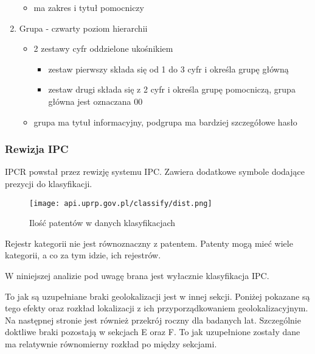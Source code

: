 \begin{enumerate}
\begin{itemize}
        \item ma zakres i tytuł pomocniczy
    \end{itemize}
    \item Grupa - czwarty poziom hierarchii
    \begin{itemize}
        \item 2 zestawy cyfr oddzielone ukośnikiem
        \begin{itemize}
            \item zestaw pierwszy składa się od 1 do 3 cyfr i określa grupę główną
            \item zestaw drugi składa się z 2 cyfr i określa grupę pomocniczą, grupa główna jest oznaczana 00
        \end{itemize}
        \item grupa ma tytuł informacyjny, podgrupa ma bardziej szczegółowe hasło
    \end{itemize}
\end{enumerate}



\subsubsection{Rewizja \ac{IPC}}

\ac{IPCR} powstał przez rewizję systemu \ac{IPC}. Zawiera dodatkowe
symbole dodające prezycji do klasyfikacji.

\begin{figure}[H]\centering
\texttt{[image: api.uprp.gov.pl/classify/dist.png]}
\caption{Ilość patentów w danych klasyfikacjach}
\end{figure}


\begin{uwaga}
Rejestr kategorii nie jest równoznaczny z patentem. Patenty
mogą mieć wiele kategorii, a co za tym idzie, ich rejestrów.
\end{uwaga}


W niniejszej analizie pod uwagę brana jest wyłacznie klasyfikacja \ac{IPC}.


To jak są uzupełniane braki geolokalizacji jest w innej sekcji.
Poniżej pokazane są tego efekty oraz rozkład lokalizacji z ich przyporządkowaniem
geolokalizacyjnym. Na następnej stronie jest również przekrój roczny dla badanych
lat. Szczególnie doktliwe braki pozostają w sekcjach E oraz F.
To jak uzupełnione zostały dane ma relatywnie równomierny rozkład po między
sekcjami.

